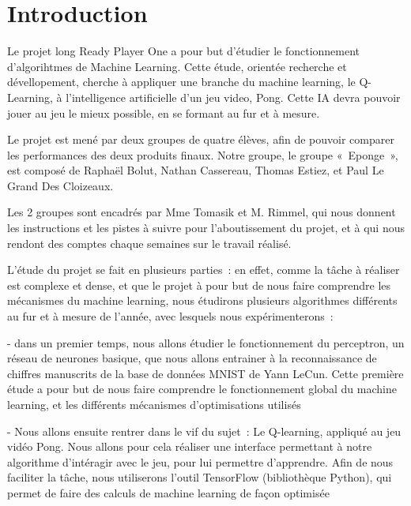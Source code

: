 \section*{Introduction}

Le projet long Ready Player One a pour but d’étudier le fonctionnement d’algorihtmes de Machine Learning. Cette étude, orientée recherche et dévellopement, cherche à appliquer une branche du machine learning, le Q-Learning, à l’intelligence artificielle d’un jeu video, Pong. Cette IA devra pouvoir jouer au jeu le mieux possible, en se formant au fur et à mesure.

Le projet est mené par deux groupes de quatre élèves, afin de pouvoir comparer les performances des deux produits finaux. Notre groupe, le groupe « Eponge », est composé de Raphaël Bolut, Nathan Cassereau, Thomas Estiez, et Paul Le Grand Des Cloizeaux. 

Les 2 groupes sont encadrés par Mme Tomasik et M. Rimmel, qui nous donnent les instructions et les pistes à suivre pour l’aboutissement du projet, et à qui nous rendont des comptes chaque semaines sur le travail réalisé.

L’étude du projet se fait en plusieurs parties : en effet, comme la tâche à réaliser est complexe et dense, et que le projet à pour but de nous faire comprendre les mécanismes du machine learning, nous étudirons plusieurs algorithmes différents au fur et à mesure de l’année, avec lesquels nous expérimenterons : 

- dans un premier temps, nous allons étudier le fonctionnement du perceptron, un réseau de neurones basique, que nous allons entrainer à la reconnaissance de chiffres manuscrits de la base de données MNIST de Yann LeCun. Cette première étude a pour but de nous faire comprendre le fonctionnement global du machine learning, et les différents mécanismes d’optimisations utilisés

- Nous allons ensuite rentrer dans le vif du sujet : Le Q-learning, appliqué au jeu vidéo Pong. Nous allons pour cela réaliser une interface permettant à notre algorithme d’intéragir avec le jeu, pour lui permettre d’apprendre. Afin de nous faciliter la tâche, nous utiliserons l’outil TensorFlow (bibliothèque Python), qui permet de faire des calculs de machine learning de façon optimisée
